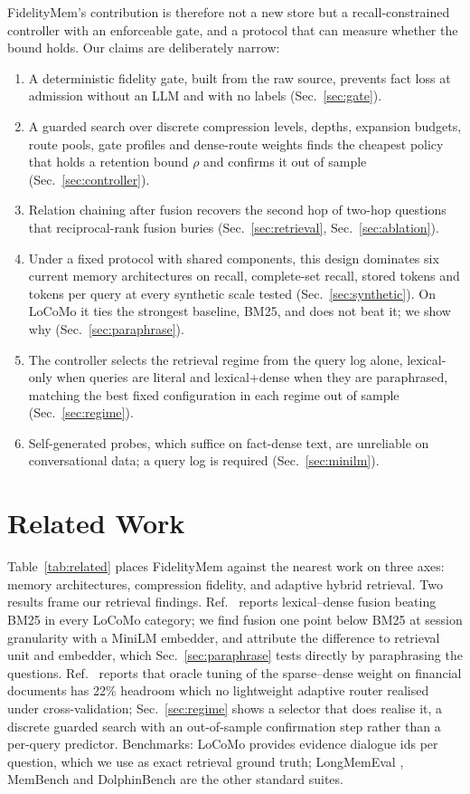 \documentclass[journal]{IEEEtran}
\begin{document}
FidelityMem's contribution is therefore not a new store but a recall-constrained controller with an enforceable gate, and a protocol that can measure whether the bound holds. Our claims are deliberately narrow:
\begin{enumerate}
\item A deterministic fidelity gate, built from the raw source, prevents fact loss at admission without an LLM and with no labels (Sec.~\ref{sec:gate}).
\item A guarded search over discrete compression levels, depths, expansion budgets, route pools, gate profiles and dense-route weights finds the cheapest policy that holds a retention bound $\rho$ and confirms it out of sample (Sec.~\ref{sec:controller}).
\item Relation chaining after fusion recovers the second hop of two-hop questions that reciprocal-rank fusion buries (Sec.~\ref{sec:retrieval}, Sec.~\ref{sec:ablation}).
\item Under a fixed protocol with shared components, this design dominates six current memory architectures on recall, complete-set recall, stored tokens and tokens per query at every synthetic scale tested (Sec.~\ref{sec:synthetic}). On LoCoMo it ties the strongest baseline, BM25, and does not beat it; we show why (Sec.~\ref{sec:paraphrase}).
\item The controller selects the retrieval regime from the query log alone, lexical-only when queries are literal and lexical+dense when they are paraphrased, matching the best fixed configuration in each regime out of sample (Sec.~\ref{sec:regime}).
\item Self-generated probes, which suffice on fact-dense text, are unreliable on conversational data; a query log is required (Sec.~\ref{sec:minilm}).
\end{enumerate}

\section{Related Work}
Table~\ref{tab:related} places FidelityMem against the nearest work on three axes: memory architectures, compression fidelity, and adaptive hybrid retrieval. Two results frame our retrieval findings. Ref.~\cite{tfusion} reports lexical--dense fusion beating BM25 in every LoCoMo category; we find fusion one point below BM25 at session granularity with a MiniLM embedder, and attribute the difference to retrieval unit and embedder, which Sec.~\ref{sec:paraphrase} tests directly by paraphrasing the questions. Ref.~\cite{fairness} reports that oracle tuning of the sparse--dense weight on financial documents has 22\% headroom which no lightweight adaptive router realised under cross-validation; Sec.~\ref{sec:regime} shows a selector that does realise it, a discrete guarded search with an out-of-sample confirmation step rather than a per-query predictor. Benchmarks: LoCoMo \cite{locomo} provides evidence dialogue ids per question, which we use as exact retrieval ground truth; LongMemEval \cite{longmemeval}, MemBench \cite{membench} and DolphinBench \cite{dolphin} are the other standard suites.
\end{document}
